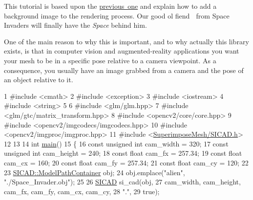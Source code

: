 This tutorial is based upon the \mbox{\hyperlink{tutorial_superimpose}{previous one}} and explain how to add a background image to the rendering process. Our good ol\textquotesingle{} fiend 👾 from Space Invaders will finally have the {\itshape Space} behind him.

 One of the main reason to why this is important, and to why actually this library exists, is that in computer vision and augmented-\/reality applications you want your mesh to be in a specific pose relative to a camera viewpoint. As a consequence, you usually have an image grabbed from a camera and the pose of an object relative to it.~\newline



\begin{DoxyCodeInclude}
1 \textcolor{preprocessor}{#include <cmath>}
2 \textcolor{preprocessor}{#include <exception>}
3 \textcolor{preprocessor}{#include <iostream>}
4 \textcolor{preprocessor}{#include <string>}
5 
6 \textcolor{preprocessor}{#include <glm/glm.hpp>}
7 \textcolor{preprocessor}{#include <glm/gtc/matrix\_transform.hpp>}
8 \textcolor{preprocessor}{#include <opencv2/core/core.hpp>}
9 \textcolor{preprocessor}{#include <opencv2/imgcodecs/imgcodecs.hpp>}
10 \textcolor{preprocessor}{#include <opencv2/imgproc/imgproc.hpp>}
11 \textcolor{preprocessor}{#include <\mbox{\hyperlink{SICAD_8h}{SuperimposeMesh/SICAD.h}}>}
12 
13 
14 \textcolor{keywordtype}{int} \mbox{\hyperlink{tutorial__background_8cpp_ae66f6b31b5ad750f1fe042a706a4e3d4}{main}}()
15 \{
16     \textcolor{keyword}{const} \textcolor{keywordtype}{unsigned} \textcolor{keywordtype}{int} cam\_width  = 320;
17     \textcolor{keyword}{const} \textcolor{keywordtype}{unsigned} \textcolor{keywordtype}{int} cam\_height = 240;
18     \textcolor{keyword}{const} \textcolor{keywordtype}{float}        cam\_fx     = 257.34;
19     \textcolor{keyword}{const} \textcolor{keywordtype}{float}        cam\_cx     = 160;
20     \textcolor{keyword}{const} \textcolor{keywordtype}{float}        cam\_fy     = 257.34;
21     \textcolor{keyword}{const} \textcolor{keywordtype}{float}        cam\_cy     = 120;
22 
23     \mbox{\hyperlink{classSICAD_a9e1e1460d4c0f331b4fd015aae4dd721}{SICAD::ModelPathContainer}} obj;
24     obj.emplace(\textcolor{stringliteral}{"alien"}, \textcolor{stringliteral}{"./Space\_Invader.obj"});
25 
26     \mbox{\hyperlink{classSICAD}{SICAD}} si\_cad(obj,
27                  cam\_width, cam\_height, cam\_fx, cam\_fy, cam\_cx, cam\_cy,
28                  \textcolor{stringliteral}{"."},
29                  \textcolor{keyword}{true});

\end{DoxyCodeInclude}
